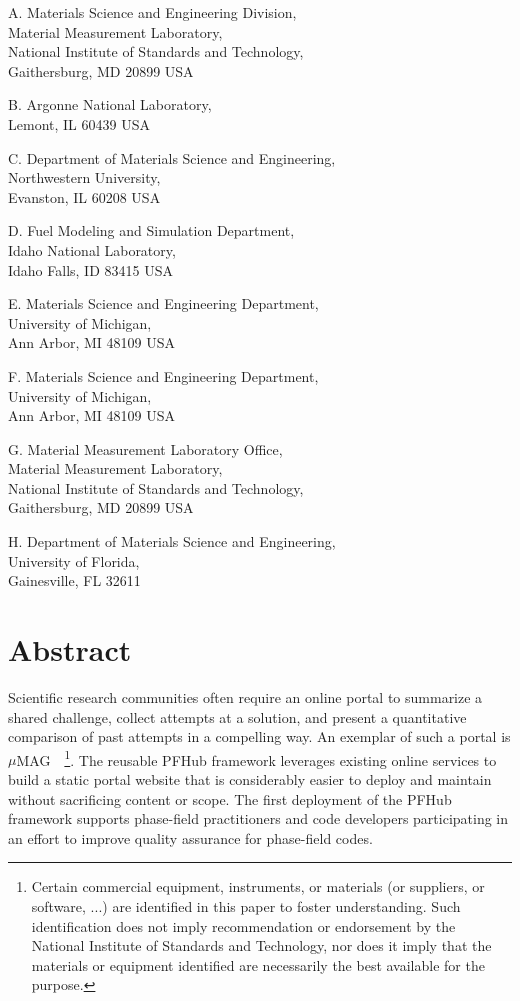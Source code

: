 \documentclass{jors}
\begin{document}
A. Materials Science and Engineering Division, \\
Material Measurement Laboratory, \\
National Institute of Standards and Technology,\\
Gaithersburg, MD 20899 USA

B. Argonne National Laboratory, \\
Lemont, IL 60439 USA

C. Department of Materials Science and Engineering, \\
Northwestern University, \\
Evanston, IL 60208 USA

D. Fuel Modeling and Simulation Department, \\
Idaho National Laboratory, \\
Idaho Falls, ID 83415 USA

E. Materials Science and Engineering Department, \\
University of Michigan, \\
Ann Arbor, MI 48109 USA

F. Materials Science and Engineering Department, \\
University of Michigan, \\
Ann Arbor, MI 48109 USA

G. Material Measurement Laboratory Office, \\
Material Measurement Laboratory, \\
National Institute of Standards and Technology,\\
Gaithersburg, MD 20899 USA

H. Department of Materials Science and Engineering, \\
University of Florida, \\
Gainesville, FL 32611

\section*{Abstract}

Scientific research communities often require an online portal to
summarize a shared challenge, collect attempts at a solution, and
present a quantitative comparison of past attempts in a compelling
way. An exemplar of such a portal is
$\mu$MAG~\cite{mumag}~\footnote{Certain commercial equipment,
  instruments, or materials (or suppliers, or software, ...) are
  identified in this paper to foster understanding. Such
  identification does not imply recommendation or endorsement by the
  National Institute of Standards and Technology, nor does it imply
  that the materials or equipment identified are necessarily the best
  available for the purpose.\label{disclaimer}}. The reusable PFHub
framework leverages existing online services to build a static portal
website that is considerably easier to deploy and maintain without
sacrificing content or scope. The first deployment of the PFHub
framework supports phase-field practitioners and code developers
participating in an effort to improve quality assurance for
phase-field codes.
\end{document}
